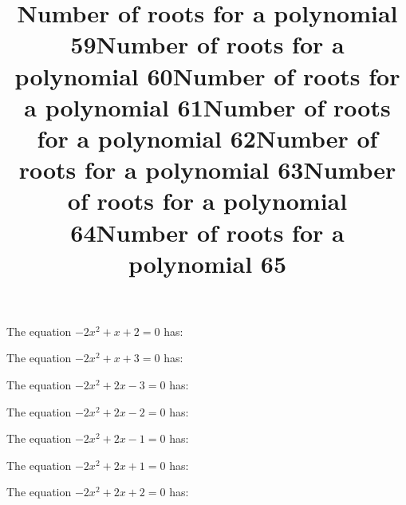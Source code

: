 \documentclass{article}
\begin{document}
\begin{category}
\begin{question}[multichoice]
\end{question}
\begin{question}[multichoice]
\title{Number of roots for a polynomial 59}
The equation $- 2 x^{2} + x + 2=0$ has:


\end{question}
\begin{question}[multichoice]
\title{Number of roots for a polynomial 60}
The equation $- 2 x^{2} + x + 3=0$ has:


\end{question}
\begin{question}[multichoice]
\title{Number of roots for a polynomial 61}
The equation $- 2 x^{2} + 2 x - 3=0$ has:


\end{question}
\begin{question}[multichoice]
\title{Number of roots for a polynomial 62}
The equation $- 2 x^{2} + 2 x - 2=0$ has:


\end{question}
\begin{question}[multichoice]
\title{Number of roots for a polynomial 63}
The equation $- 2 x^{2} + 2 x - 1=0$ has:


\end{question}
\begin{question}[multichoice]
\title{Number of roots for a polynomial 64}
The equation $- 2 x^{2} + 2 x + 1=0$ has:


\end{question}
\begin{question}[multichoice]
\title{Number of roots for a polynomial 65}
The equation $- 2 x^{2} + 2 x + 2=0$ has:


\end{question}
\end{category}
\end{document}
